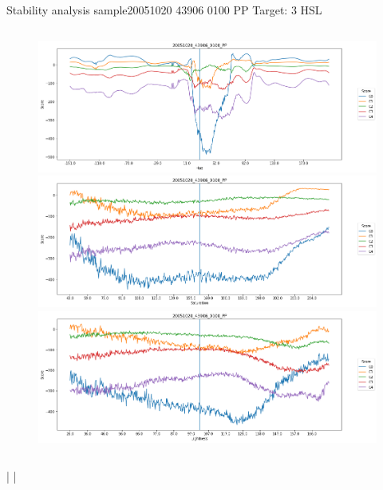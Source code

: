 \documentclass{beamer}
\begin{document}
\begin{frame}{Stability analysis sample}{20051020 43906 0100 PP Target: 3 HSL}
\begin{columns}
\begin{column}{0.45\textwidth}
\begin{figure}[p]
\includegraphics[width=\textwidth]{chapter_stability/20051020_43906_0100_PP/h/scores.png}			\includegraphics[width=\textwidth]{chapter_stability/20051020_43906_0100_PP/s/scores.png}			\includegraphics[width=\textwidth]{chapter_stability/20051020_43906_0100_PP/l/scores.png}
\end{figure}
\end{column}
\end{columns}
\href{run:videos_stability/Messidor_20051020_43906_0100_PP_Target_3_Checking_Hue_Sensitivity.mp4}{\color{blue}{Hue}} | \href{run:videos_stability/Messidor_20051020_43906_0100_PP_Target_3_Checking_Saturation_Sensitivity.mp4}{\color{blue}{Saturation}} | \href{run:videos_stability/Messidor_20051020_43906_0100_PP_Target_3_Checking_Luminance_Sensitivity.mp4}{\color{blue}{Lightness}}
\end{frame}
\end{document}
